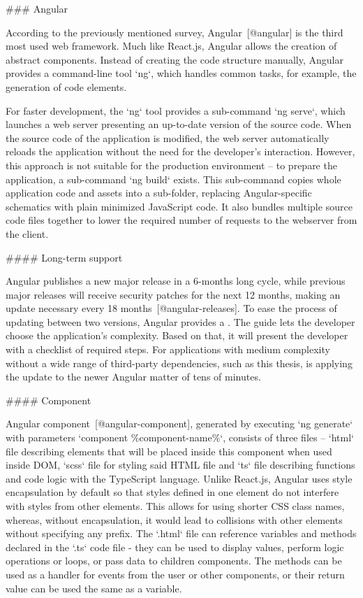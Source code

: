 \documentclass[
  digital, %
  oneside, %
  lof,     %
  nolot,     %
]{fithesis4}
\begin{document}
### Angular

According to the previously mentioned survey, Angular~[@angular] is the third most used web framework. Much like React.js, Angular allows the creation of abstract components. Instead of creating the code structure manually, Angular provides a command-line tool `ng`, which handles common tasks, for example, the generation of code elements.

For faster development, the `ng` tool provides a sub-command `ng serve`, which launches a web server presenting an up-to-date version of the source code. When the source code of the application is modified, the web server automatically reloads the application without the need for the developer's interaction. However, this approach is not suitable for the production environment -- to prepare the application, a sub-command `ng build` exists. This sub-command copies whole application code and assets into a sub-folder, replacing Angular-specific schematics with plain minimized JavaScript code. It also bundles multiple source code files together to lower the required number of requests to the webserver from the client.

#### Long-term support

Angular publishes a new major release in a 6-months long cycle, while previous major releases will receive security patches for the next 12 months, making an update necessary every 18 months~[@angular-releases]. To ease the process of updating between two versions, Angular provides a . The guide lets the developer choose the application's complexity. Based on that, it will present the developer with a checklist of required steps. For applications with medium complexity without a wide range of third-party dependencies, such as this thesis, is applying the update to the newer Angular matter of tens of minutes.

#### Component

Angular component~[@angular-component], generated by executing `ng generate` with parameters `component \%component-name\%`, consists of three files -- `html` file describing elements that will be placed inside this component when used inside DOM, `scss` file for styling said HTML file and `ts` file describing functions and code logic with the TypeScript language. Unlike React.js, Angular uses style encapsulation by default so that styles defined in one element do not interfere with styles from other elements. This allows for using shorter \acrshort{CSS} class names, whereas, without encapsulation, it would lead to collisions with other elements without specifying any prefix. The `.html` file can reference variables and methods declared in the `.ts` code file - they can be used to display values, perform logic operations or loops, or pass data to children components. The methods can be used as a handler for events from the user or other components, or their return value can be used the same as a variable.
\end{document}
